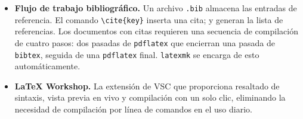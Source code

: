 \begin{itemize}
    \item \textbf{Flujo de trabajo bibliográfico.} Un archivo
          \texttt{.bib} almacena las entradas de referencia. El
          comando \verb|\cite{key}| inserta una cita;
          \verb|| y
          \verb|| generan la lista de
          referencias. Los documentos con citas requieren una
          secuencia de compilación de cuatro pasos: dos pasadas de
          \texttt{pdflatex} que encierran una pasada de
          \texttt{bibtex}, seguida de una \texttt{pdflatex} final.
          \texttt{latexmk} se encarga de esto automáticamente.
    \item \textbf{LaTeX Workshop.} La extensión de VSC que
          proporciona resaltado de sintaxis, vista previa en vivo y
          compilación con un solo clic, eliminando la necesidad de
          compilación por línea de comandos en el uso diario.
\end{itemize}
